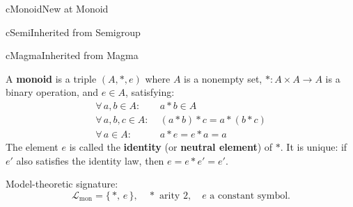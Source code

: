 

\clearpage\thispagestyle{plain}

\begin{bpnew}{cMonoid}{New at Monoid}
\end{bpnew}

\begin{bpinh}{cSemi}{Inherited from Semigroup}
\end{bpinh}

\begin{bpinh}{cMagma}{Inherited from Magma}
\end{bpinh}

\begin{definition}[Monoid]
  A \textbf{monoid} is a triple $(A, *, e)$ where $A$ is a nonempty set,
  $* : A \times A \to A$ is a binary operation, and $e \in A$, satisfying:
  \begin{align*}
    \forall\,a,b \in A:&\; a * b \in A \tag{Closure}\\
    \forall\,a,b,c \in A:&\; (a*b)*c = a*(b*c) \tag{Associativity}\\
    \forall\,a \in A:&\; a * e = e * a = a \tag{Identity}
  \end{align*}
  The element $e$ is called the \textbf{identity} (or \textbf{neutral element})
  of $*$.  It is unique: if $e'$ also satisfies the identity law, then
  $e = e * e' = e'$.

  \medskip\noindent
  Model-theoretic signature:
  \[
    \mathcal{L}_{\mathrm{mon}} = \{\,*,\, e\,\},
    \quad * \text{ arity } 2,\quad e \text{ a constant symbol.}
  \]
\end{definition}

